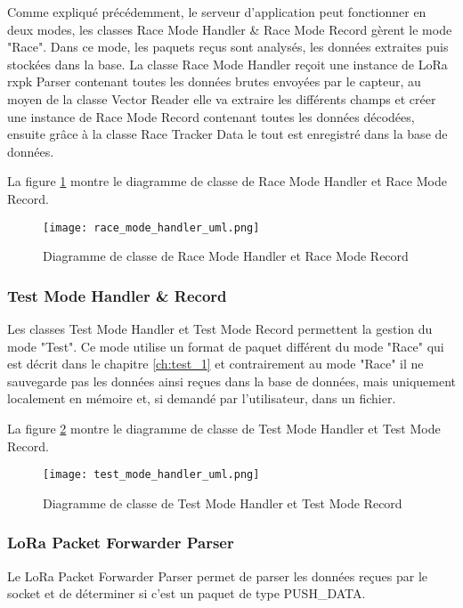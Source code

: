 Comme expliqué précédemment, le serveur d'application peut fonctionner en deux modes, les classes Race Mode Handler \& Race Mode Record gèrent le mode "Race". Dans ce mode, les paquets reçus sont analysés, les données extraites puis stockées dans la base. La classe Race Mode Handler reçoit une instance de LoRa rxpk Parser contenant toutes les données brutes envoyées par le capteur, au moyen de la classe Vector Reader elle va extraire les différents champs et créer une instance de Race Mode Record contenant toutes les données décodées, ensuite grâce à la classe Race Tracker Data le tout est enregistré dans la base de données.

La figure \ref{fig:race_mode_handler_uml} montre le diagramme de classe de Race Mode Handler et Race Mode Record.

\begin{figure}[htb]
\centering 
\texttt{[image: race\_mode\_handler\_uml.png]} 
\caption{Diagramme de classe de Race Mode Handler et Race Mode Record}
\label{fig:race_mode_handler_uml}
 \end{figure}

\subsubsection{Test Mode Handler \& Record}

Les classes Test Mode Handler et Test Mode Record permettent la gestion du mode "Test". Ce mode utilise un format de paquet différent du mode "Race" qui est décrit dans le chapitre \ref{ch:test_1} et contrairement au mode "Race" il ne sauvegarde pas les données ainsi reçues dans la base de données, mais uniquement localement en mémoire et, si demandé par l'utilisateur, dans un fichier.

La figure \ref{fig:test_mode_handler_uml} montre le diagramme de classe de Test Mode Handler et Test Mode Record.

\begin{figure}[htb]
\centering 
\texttt{[image: test\_mode\_handler\_uml.png]} 
\caption{Diagramme de classe de Test Mode Handler et Test Mode Record}
\label{fig:test_mode_handler_uml}
 \end{figure}

\subsubsection{LoRa Packet Forwarder Parser}

Le LoRa Packet Forwarder Parser permet de parser les données reçues par le socket et de déterminer si c'est un paquet de type PUSH\_DATA.

